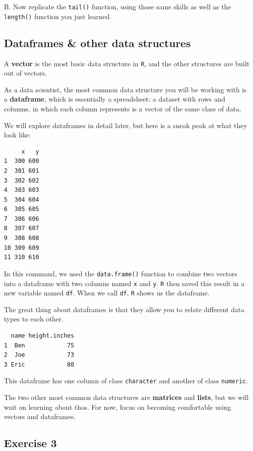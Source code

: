 \documentclass[
]{book}
\begin{document}
B. Now replicate the \texttt{tail()} function, using those same skills as well as the \texttt{length()} function you just learned.

\hypertarget{dataframes-other-data-structures}{%
\subsection{Dataframes \& other data structures}\label{dataframes-other-data-structures}}

A \textbf{vector} is the most basic data structure in \texttt{R}, and the other structures are built out of vectors.

As a data scientist, the most common data structure you will be working with is a \textbf{dataframe}, which is essentially a spreadsheet: a dataset with rows and columns, in which each column represents is a vector of the same class of data.

We will explore dataframes in detail later, but here is a sneak peak at what they look like:

\begin{verbatim}
     x   y
1  300 600
2  301 601
3  302 602
4  303 603
5  304 604
6  305 605
7  306 606
8  307 607
9  308 608
10 309 609
11 310 610
\end{verbatim}

In this command, we used the \texttt{data.frame()} function to combine two vectors into a dataframe with two columns named \texttt{x} and \texttt{y}. \texttt{R} then saved this result in a new variable named \texttt{df}. When we call \texttt{df}, \texttt{R} shows us the dataframe.

The great thing about dataframes is that they allow you to relate different data types to each other.

\begin{verbatim}
  name height.inches
1  Ben            75
2  Joe            73
3 Eric            80
\end{verbatim}

This dataframe has one column of class \texttt{character} and another of class \texttt{numeric}.

The two other most common data structures are \textbf{matrices} and \textbf{lists}, but we will wait on learning about thos. For now, focus on becoming comfortable using vectors and dataframes.

\hypertarget{exercise-3-3}{%
\subsection*{Exercise 3}\label{exercise-3-3}}
\end{document}
